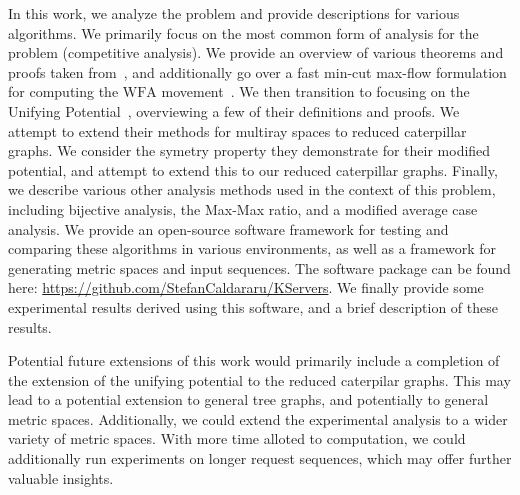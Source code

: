 In this work, we analyze the \KS problem and provide descriptions for various algorithms. We primarily focus on the most common form of analysis for the \KS problem (competitive analysis). We provide an overview of various theorems and proofs taken from~\cite{OnlineComp1998}, and additionally go over a fast min-cut max-flow formulation for computing the $\mathrm{WFA}$ movement~\cite{mcfp2011}. We then transition to focusing on the Unifying Potential~\cite{unifyingPotential2021}, overviewing a few of their definitions and proofs. We attempt to extend their methods for multiray spaces to reduced caterpillar graphs. We consider the symetry property they demonstrate for their modified potential, and attempt to extend this to our reduced caterpillar graphs. Finally, we describe various other analysis methods used in the context of this problem, including bijective analysis, the Max-Max ratio, and a modified average case analysis. We provide an open-source software framework for testing and comparing these algorithms in various environments, as well as a framework for generating metric spaces and input sequences. The software package can be found here: \url{https://github.com/StefanCaldararu/KServers}. We finally provide some experimental results derived using this software, and a brief description of these results.

Potential future extensions of this work would primarily include a completion of the extension of the unifying potential to the reduced caterpilar graphs. This may lead to a potential extension to general tree graphs, and potentially to general metric spaces. Additionally, we could extend the experimental analysis to a wider variety of metric spaces. With more time alloted to computation, we could additionally run experiments on longer request sequences, which may offer further valuable insights.